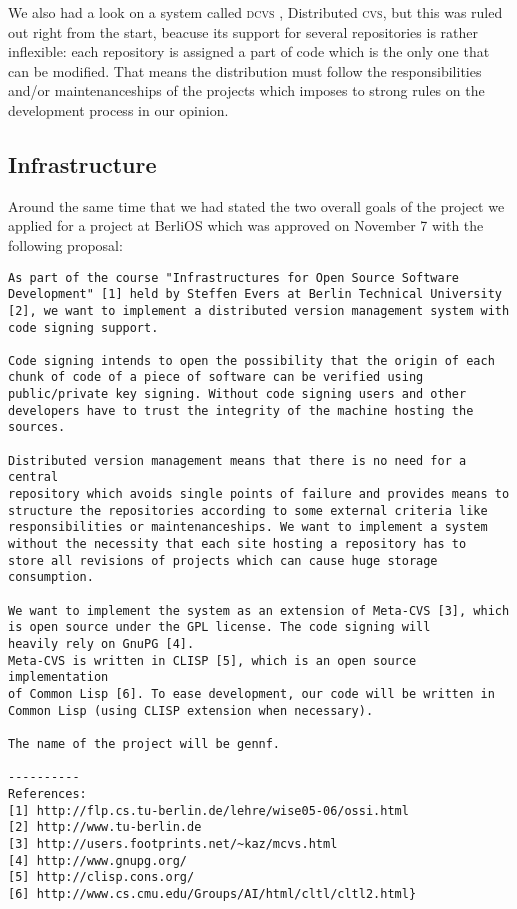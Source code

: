 \documentclass[fleqn, 10pt, a4paper]{report} \usepackage{amssymb}
\begin{document}
We also had a look on a system called \textsc{dcvs} \cite{Dcvs06},
Distributed \textsc{cvs}, but this was ruled out right from the start,
beacuse its support for several repositories is rather inflexible:
each repository is assigned a part of code which is the only one that
can be modified.  That means the distribution must follow the
responsibilities and/or maintenanceships of the projects which imposes
to strong rules on the development process in our opinion.

\subsection{Infrastructure}

Around the same time that we had stated the two overall goals of the
project we applied for a project at BerliOS which was approved on
November 7 with the following proposal:

{\small
\begin{verbatim}
As part of the course "Infrastructures for Open Source Software
Development" [1] held by Steffen Evers at Berlin Technical University
[2], we want to implement a distributed version management system with
code signing support.

Code signing intends to open the possibility that the origin of each
chunk of code of a piece of software can be verified using
public/private key signing. Without code signing users and other
developers have to trust the integrity of the machine hosting the
sources.

Distributed version management means that there is no need for a central
repository which avoids single points of failure and provides means to
structure the repositories according to some external criteria like
responsibilities or maintenanceships. We want to implement a system
without the necessity that each site hosting a repository has to
store all revisions of projects which can cause huge storage
consumption.

We want to implement the system as an extension of Meta-CVS [3], which
is open source under the GPL license. The code signing will 
heavily rely on GnuPG [4].
Meta-CVS is written in CLISP [5], which is an open source implementation
of Common Lisp [6]. To ease development, our code will be written in
Common Lisp (using CLISP extension when necessary).

The name of the project will be gennf.

----------
References:
[1] http://flp.cs.tu-berlin.de/lehre/wise05-06/ossi.html
[2] http://www.tu-berlin.de
[3] http://users.footprints.net/~kaz/mcvs.html
[4] http://www.gnupg.org/
[5] http://clisp.cons.org/
[6] http://www.cs.cmu.edu/Groups/AI/html/cltl/cltl2.html}
\end{verbatim}}
\end{document}
